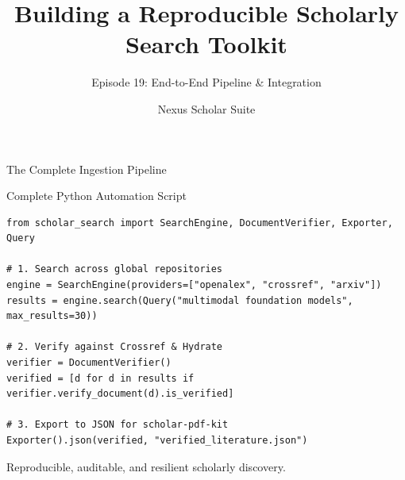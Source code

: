 \documentclass[aspectratio=169]{beamer}
\title{Building a Reproducible Scholarly Search Toolkit}
\subtitle{Episode 19: End-to-End Pipeline \& Integration}
\author{Nexus Scholar Suite}
\date{}
\begin{document}
\begin{frame}[plain]
  \titlepage
\end{frame}

\begin{frame}{The Complete Ingestion Pipeline}
  \begin{center}
  \end{center}
\end{frame}

\begin{frame}[fragile]{Complete Python Automation Script}
\begin{lstlisting}[style=nexuspython]
from scholar_search import SearchEngine, DocumentVerifier, Exporter, Query

# 1. Search across global repositories
engine = SearchEngine(providers=["openalex", "crossref", "arxiv"])
results = engine.search(Query("multimodal foundation models", max_results=30))

# 2. Verify against Crossref & Hydrate
verifier = DocumentVerifier()
verified = [d for d in results if verifier.verify_document(d).is_verified]

# 3. Export to JSON for scholar-pdf-kit
Exporter().json(verified, "verified_literature.json")
\end{lstlisting}
\end{frame}

\begin{frame}[standout]
  Reproducible, auditable, and resilient scholarly discovery.
\end{frame}
\end{document}
